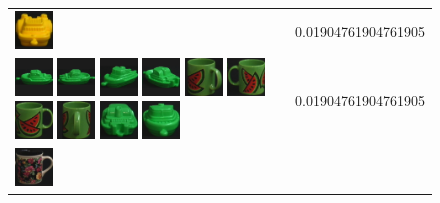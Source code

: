 {\begin{figure}[p]
\begin{tabular}{m{11cm} | m{3cm} |}
\includegraphics[width=1cm]{coil/beeld-14.eps}
& {\scriptsize 0.01904761904761905}
\\
\includegraphics[width=1cm]{coil/beeld-54.eps}
\includegraphics[width=1cm]{coil/beeld-55.eps}
\includegraphics[width=1cm]{coil/beeld-57.eps}
\includegraphics[width=1cm]{coil/beeld-58.eps}
\includegraphics[width=1cm]{coil/beeld-34.eps}
\includegraphics[width=1cm]{coil/beeld-31.eps}
\includegraphics[width=1cm]{coil/beeld-30.eps}
\includegraphics[width=1cm]{coil/beeld-35.eps}
\includegraphics[width=1cm]{coil/beeld-59.eps}
\includegraphics[width=1cm]{coil/beeld-56.eps}
& {\scriptsize 0.01904761904761905}
\\
\includegraphics[width=1cm]{coil/beeld-60.eps}

\end{tabular}
\end{figure}}
